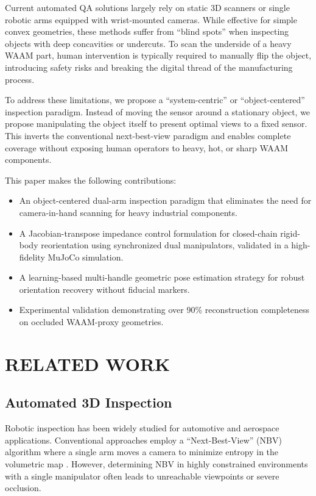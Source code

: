 \documentclass[letterpaper, 10 pt, conference]{ieeeconf}  %
\begin{document}
Current automated QA solutions largely rely on static 3D scanners or single
robotic arms equipped with wrist-mounted cameras. While effective for simple
convex geometries, these methods suffer from ``blind spots'' when inspecting
objects with deep concavities or undercuts. To scan the underside of a heavy
WAAM part, human intervention is typically required to manually flip the
object, introducing safety risks and breaking the digital thread of the
manufacturing process.

To address these limitations, we propose a ``system-centric'' or
``object-centered'' inspection paradigm. Instead of moving the sensor around
a stationary object, we propose manipulating the object itself to present
optimal views to a fixed sensor. This inverts the conventional next-best-view
paradigm and enables complete coverage without exposing human operators to
heavy, hot, or sharp WAAM components.

This paper makes the following contributions:

\begin{itemize}
    \item An object-centered dual-arm inspection paradigm that eliminates the
    need for camera-in-hand scanning for heavy industrial components.

    \item A Jacobian-transpose impedance control formulation for closed-chain
    rigid-body reorientation using synchronized dual manipulators, validated
    in a high-fidelity MuJoCo simulation.

    \item A learning-based multi-handle geometric pose estimation strategy
    for robust orientation recovery without fiducial markers.

    \item Experimental validation demonstrating over 90\% reconstruction
    completeness on occluded WAAM-proxy geometries.
\end{itemize}


\section{RELATED WORK}

\subsection{Automated 3D Inspection}
Robotic inspection has been widely studied for automotive and aerospace
applications. Conventional approaches employ a ``Next-Best-View'' (NBV)
algorithm where a single arm moves a camera to minimize entropy in the
volumetric map \cite{bircher2016receding}. However, determining NBV in highly
constrained environments with a single manipulator often leads to unreachable
viewpoints or severe occlusion.
\end{document}
